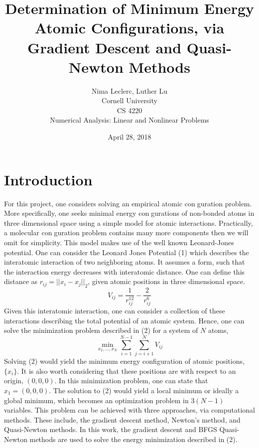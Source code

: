 \documentclass{article}
\begin{document}
 
\title{\bf{Determination of Minimum Energy Atomic Configurations, via Gradient Descent and Quasi-Newton Methods }} 
\author{Nima Leclerc, Luther Lu\\Cornell University\\CS 4220 \\ Numerical Analysis: Linear and Nonlinear Problems}
\date{April 28, 2018}
\maketitle
\newpage 
\section*{Introduction} 
For this project, one considers solving an empirical atomic conguration problem. More specifically, one seeks  minimal energy congurations of non-bonded atoms in three dimensional space using a simple model for atomic interactions. Practically, a molecular conguration
problem contains many more components then we will omit for simplicity. This model makes use of the well known Leonard-Jones potential. \newline 
One can consider the Leonard Jones Potential (1) which describes the interatomic interaction of two neighboring atoms. It assumes a form, such that the interaction energy decreases with interatomic distance. One can define this distance as $r_{ij} = ||x_{i}-x_{j}||_{2}$, given atomic positions in three dimensional space. 
\begin{equation}
V_{ij}=\frac{1}{r_{ij}^{12}} - \frac{2}{r_{ij}^{6}}
\end{equation}
Given this interatomic interaction, one can consider a collection of these interactions describing the total potential of an atomic system. Hence, one can solve the minimization problem described in (2) for a system of  $N$ atoms, 
\begin{equation}
\min_{x_{2}, ...,x_{N}} \sum_{i=1}^{N-1} \sum_{j=i+1}^{N} V_{ij}
\end{equation}
Solving (2) would yield the minimum energy configuration of atomic positions, $\{ x_{i} \} $. It is also worth considering that these positions are with respect to an origin, $(0,0,0)$. In this minimization problem, one can state that $x_{1} = (0,0,0)$. The solution to (2) would yield a local minimum or ideally a global minimum, which becomes an optimization problem in $3(N-1)$ variables. \newline \newline 
This problem can be achieved with three approaches, via computational methods. These include, the gradient descent method, Newton's  method, and Quasi-Newton methods. In this work, the gradient descent and BFGS Quasi-Newton methods are used to solve the energy minimization described in (2). \newline  \newline 
\end{document}
